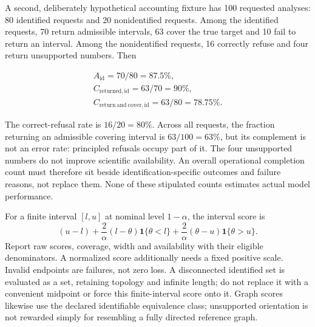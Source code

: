 A second, deliberately hypothetical accounting fixture has 100 requested
analyses: 80 identified requests and 20 nonidentified requests. Among
the identified requests, 70 return admissible intervals, 63 cover the
true target and 10 fail to return an interval. Among the nonidentified
requests, 16 correctly refuse and four return unsupported numbers. Then

\[
 \begin{gathered}
 A_{\mathrm{id}}=70/80=87.5\%,\\
 C_{\mathrm{returned,id}}=63/70=90\%,\\
 C_{\mathrm{return\ and\ cover,id}}=63/80=78.75\%.
\end{gathered}
\]

The correct-refusal rate is \(16/20=80\%\). Across all requests, the
fraction returning an admissible covering interval is \(63/100=63\%\),
but its complement is not an error rate: principled refusals occupy part
of it. The four unsupported numbers do not improve scientific
availability. An overall operational completion count must therefore sit
beside identification-specific outcomes and failure reasons, not replace
them. None of these stipulated counts estimates actual model
performance.~\citep{exec14_evaluation_oracle}

For a finite interval \([l,u]\) at nominal level \(1-\alpha\), the
interval score is \[
 (u-l)+\frac{2}{\alpha}(l-\theta)\mathbf1\{\theta<l\}
       +\frac{2}{\alpha}(\theta-u)\mathbf1\{\theta>u\}.
\] Report raw scores, coverage, width and availability with their
eligible denominators. A normalized score additionally needs a fixed
positive scale. Invalid endpoints are failures, not zero loss. A
disconnected identified set is evaluated as a set, retaining topology
and infinite length; do not replace it with a convenient midpoint or
force this finite-interval score onto it. Graph scores likewise use the
declared identifiable equivalence class; unsupported orientation is not
rewarded simply for resembling a fully directed reference graph.
